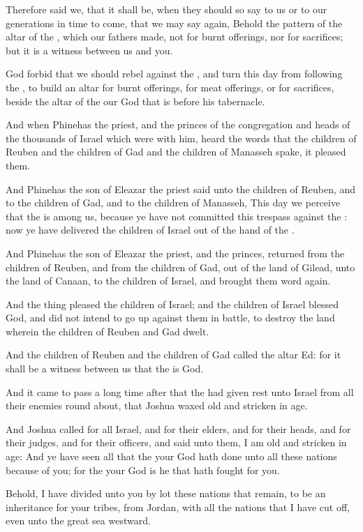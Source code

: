 \Verse Therefore said we, that it shall be, when they should so say to us or to our generations in time to come, that we may say again, Behold the pattern of the altar of the \LORD, which our fathers made, not for burnt offerings, nor for sacrifices; but it is a witness between us and you.

\Verse God forbid that we should rebel against the \LORD, and turn this day from following the \LORD, to build an altar for burnt offerings, for meat offerings, or for sacrifices, beside the altar of the \LORD our God that is before his tabernacle.

\Verse And when Phinehas the priest, and the princes of the congregation and heads of the thousands of Israel which were with him, heard the words that the children of Reuben and the children of Gad and the children of Manasseh spake, it pleased them.

\Verse And Phinehas the son of Eleazar the priest said unto the children of Reuben, and to the children of Gad, and to the children of Manasseh, This day we perceive that the \LORD is among us, because ye have not committed this trespass against the \LORD: now ye have delivered the children of Israel out of the hand of the \LORD.

\Verse And Phinehas the son of Eleazar the priest, and the princes, returned from the children of Reuben, and from the children of Gad, out of the land of Gilead, unto the land of Canaan, to the children of Israel, and brought them word again.

\Verse And the thing pleased the children of Israel; and the children of Israel blessed God, and did not intend to go up against them in battle, to destroy the land wherein the children of Reuben and Gad dwelt.

\Verse And the children of Reuben and the children of Gad called the altar Ed: for it shall be a witness between us that the \LORD is God.


\Chapter
\Verse And it came to pass a long time after that the \LORD had given rest unto Israel from all their enemies round about, that Joshua waxed old and stricken in age.

\Verse And Joshua called for all Israel, and for their elders, and for their heads, and for their judges, and for their officers, and said unto them, I am old and stricken in age: \Verse And ye have seen all that the \LORD your God hath done unto all these nations because of you; for the \LORD your God is he that hath fought for you.

\Verse Behold, I have divided unto you by lot these nations that remain, to be an inheritance for your tribes, from Jordan, with all the nations that I have cut off, even unto the great sea westward.

